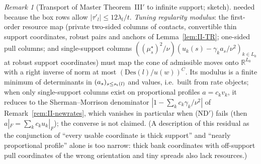 \documentclass[10pt]{amsart}
\theoremstyle{definition}
\theoremstyle{remark}
\newtheorem{remark}[theorem]{Remark}
\newcommand{\R}{\mathbb R}
\begin{document}
\begin{remark}[Transport of Master Theorem~III$'$ to infinite support;
sketch]
needed because the box rows allow $|\tau'_l|\le12\lambda_l/t$.  \emph{Tuning
regularity modulus}: the first-order resource map (private two-sided columns
of contacts, convertible thin support coordinates, robust pairs and anchors of
Lemma~\ref{lem:II-TR}; one-sided pull columns; and single-support columns
$((\mu^\star_s)^2/\nu)(u_k(s)-\gamma_ka_s/\nu^2)_{k\in L_0}$ at robust support
coordinates) must map the cone of admissible moves onto $\R^{L_0}$ with a right
inverse of norm at most $(\mathrm{Des}(l)/u(w))^C$.  Its modulus is a finite
minimum of determinants in $(a_s)_{s\le s_{\rm t}(l)}$ and values, i.e.\ built
from rate objects; when only single-support columns exist on proportional
profiles $a=c_kv_k$, it reduces to the Sherman--Morrison denominator
$|1-\sum_kc_k\gamma_k/\nu^2|$ of Remark~\ref{rem:II-newrates}, which vanishes
in particular when (ND$'$) fails (then $a|_F=\sum_kc_ku_k|_F$); the converse
is not claimed.  (A description of this residual as the
conjunction of ``every usable coordinate is thick support'' and ``nearly
proportional profile'' alone is too narrow: thick bank coordinates with
off-support pull coordinates of the wrong orientation and tiny spreads also
lack resources.)
\end{remark}
\end{document}
